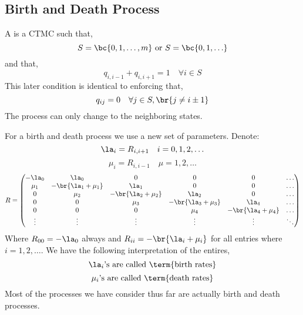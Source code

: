 \documentclass{article}
\begin{document}
    \subsection{Birth and Death Process}
    \begin{definition}
        A  is a CTMC such that,
        \[ S = \bc{0, 1,\ldots,m} \text{ or } S = \bc{0, 1,\ldots} \]
        and that,
        \[ q_{i, i - 1} + q_{i, i + 1} = 1 \quad \forall i \in S\]
        This later condition is identical to enforcing that,
        \[ q_{ij} = 0 \quad \forall j \in S, \br{j \neq i \pm 1} \]
        The process can only change to the neighboring states.
    \end{definition}
    For a birth and death process we use a new set of parameters. Denote:
    \[ \la_i = R_{i, i + 1} \quad i = 0, 1, 2, \ldots \]
    \[ \mu_i = R_{i, i - 1} \quad \mu = 1, 2, \ldots \]
    \[ R = \begin{pmatrix}
        - \la_0 & \la_0 & 0 & 0 & 0 & \ldots \\
        \mu_1 & -\br{\la_1 + \mu_1} & \la_1 & 0 & 0 & \ldots \\
        0 & \mu_2 & -\br{\la_2 + \mu_2} & \la_2 & 0 & \ldots \\
        0 & 0 & \mu_3 & -\br{\la_3 + \mu_3} & \la_4 & \ldots \\
        0 & 0 & 0 & \mu_4 & -\br{\la_4 + \mu_4} & \ldots \\
        \vdots & \vdots & \vdots & \vdots & \vdots & \ddots \\
    \end{pmatrix} \]
    Where $R_{00} = - \la_0$ always and $R_{ii} = -\br{\la_i + \mu_i}$ for all entries where $i = 1,2,\ldots$. We have the following interpretation of the entires,
    \[ \text{$\la_{i}$'s are called \term{birth rates}} \]
    \[ \text{$\mu_{i}$'s are called \term{death rates}} \]
    Most of the processes we have consider thus far are actually birth and death processes.
\end{document}
